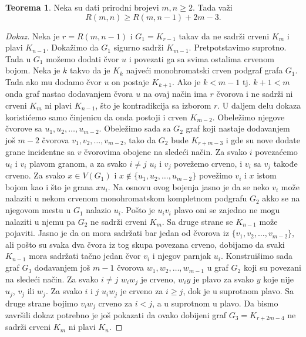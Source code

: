 \documentclass{article}
\theoremstyle{definition}
\newtheorem{teorema}{Teorema}[section]
\newcommand{\dokaz}[1]{\begin{proof}[Dokaz]#1\end{proof}}
\begin{document}
	\begin{teorema}\label{dot4}
	Neka su dati prirodni brojevi $m, n \geq 2$. Tada važi $$R(m,n) \geq R(m,n-1) + 2m - 3.$$
	\dokaz{
		Neka je $r = R(m, n - 1)$ i $G_1 = K_{r - 1}$ takav da ne sadrži crveni $K_m$ i plavi $K_{n-1}$. Dokažimo da $G_1$ sigurno sadrži $K_{m - 1}$.
		Pretpotstavimo suprotno. Tada u $G_1$ možemo dodati čvor $u$ i povezati ga sa svima ostalima crvenom bojom. Neka je $k$ takvo da je $K_k$
		najveći monohromatski crven podgraf grafa $G_1$. Tada ako mu dodamo čvor $u$ on postaje $K_{k + 1}$. Ako je $k < m - 1$ tj. $k + 1< m$ 				onda graf nastao dodavanjem čvora $u$ na ovaj način ima $r$ čvorova i ne sadrži ni crveni $K_m$ ni plavi $K_{n - 1}$, što je kontradikcija sa 				izborom $r$. \newline
		U daljem delu dokaza koristićemo samo činjenicu da onda postoji i crven $K_{m - 2}$. Obeležimo njegove čvorove sa $u_1, u_2, \dots,u_{m - 2}$.
		Obeležimo sada sa $G_2$ graf koji nastaje dodavanjem još $m - 2$ čvorova $v_1, v_2, \dots,v_{m - 2}$, tako da $G_2$ bude $K_{r + m - 3}$ i 
		gde su nove dodate grane incidentne sa $v$ čvorovima obojene na sledeći način.
		Za svako $i$ povezaćemo $u_i$ i $v_i$ plavom granom, a za svako $i \neq j$ $u_i$ i $v_j$ povežemo crveno, i $v_i$ sa $v_j$ takođe crveno.
		Za svako $x \in V(G_1)$ i $x \notin \{u_1, u_2, \dots,u_{m - 2}\}$ povežimo $v_i$ i $x$ istom bojom kao i što je grana $xu_i$. Na osnovu ovog 
		bojenja jasno je da se neko $v_i$ može nalaziti u nekom crvenom monohromatskom kompletnom podgrafu $G_2$ akko se na njegovom mestu
		u $G_1$ nalazio $u_i$. Pošto je $u_i v_i$ plavo oni se zajedno ne mogu nalaziti u njemu pa $G_2$ ne sadrži crveni $K_m$. Sa druge strane se
		$K_{n - 1}$ može pojaviti. Jasno je da on mora sadržati bar jedan od čvorova iz $\{v_1, v_2, \dots,v_{m - 2}\}$, ali pošto su svaka dva čvora iz
		tog skupa povezana crveno, dobijamo da svaki $K_{n - 1}$ mora sadržati tačno jedan čvor $v_i$ i njegov parnjak $u_i$. \newline
		Konstruišimo sada graf $G_3$ dodavanjem još $m - 1$ čvorova $w_1, w_2, \dots, w_{m - 1}$ u graf $G_2$ koji su povezani na 						sledeći način. Za svako $i \neq j$ $w_i w_j$ je crveno, $w_i y$ je plavo za svako $y$ koje nije $u_j$, $v_j$ ili $w_j$. Za svako $i$ i $j$ $u_i w_j$
		je crveno za $i \geq j$, dok je u suprotnom plavo. Sa druge strane bojimo $v_i w_j$ crveno za $i < j$, a u suprotnom u plavo. Da bismo završili
		dokaz potrebno je još pokazati da ovako dobijeni graf $G_3 = K_{r + 2m - 4}$ ne sadrži crveni $K_m$ ni plavi $K_n$. \newline
}
\end{teorema}
\end{document}
